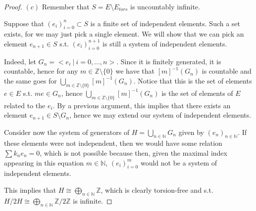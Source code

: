 \documentclass{article}
\newcommand{\numberset}{\mathbb}
\newcommand{\N}{\numberset{N}}
\newcommand{\Z}{\numberset{Z}}
\newcommand{\exercise}[1]{\noindent {\bf Exercise #1}}
\begin{document}
\begin{proof}
    $(c)$ Remember that $S=E\setminus E_{tors}$ is uncountably infinite.

    Suppose that $(e_i)_{i=0}^n\subset S$ is a finite set of independent
    elements. Such a set exists, for we may just pick a single element. We will
    show that we can pick an element $e_{n+1}\in S$ s.t.
    $(e_i)_{i=0}^{n+1}$ is still a system of independent elements.

    Indeed, let $G_n=<e_i\ |\ i=0,\ldots,n>$. Since it is finitely generated, it
    is countable, hence for any $m\in\Z\setminus\{0\}$ we have that
    $[m]^{-1}(G_n)$ is countable and the same goes for
    $\bigcup_{m\in\Z\setminus\{0\}}[m]^{-1}(G_n)$. Notice that this is the set
    of elements $e\in E$ s.t. $me\in G_n$, hence
    $\bigcup_{m\in\Z\setminus\{0\}}[m]^{-1}(G_n)$ is the set of elements of $E$
    related to the $e_i$. By a previous argument, this implies that there exists
    an element $e_{n+1}\in S\setminus G_n$, hence we may extend our system of
    independent elements.

    Consider now the system of generators of $H=\bigcup_{n\in\N} G_n$ given by
    $(e_n)_{n\in\N}$. If these elements were not independent, then we would have
    some relation $\sum k_ne_n=0$, which is not possible because then, given the
    maximal index appearing in this equation $m\in\N$, $(e_i)_{i=0}^m$ would not
    be a system of independent elements.

    This implies that $H\cong\bigoplus_{n\in\N}\Z$, which is clearly
    torsion-free and s.t. $H/2H\cong\bigoplus_{n\in\N}\Z/2\Z$ is infinite.
\end{proof}


~\\
\exercise{2}
\end{document}
